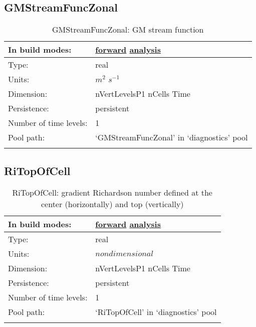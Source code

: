\subsection[GMStreamFuncZonal]{GMStreamFuncZonal}
\label{subsec:var_sec_diagnostics_GMStreamFuncZonal}
\begin{center}
\begin{longtable}{| p{2.0in} | p{4.0in} |}
        \hline 
        In build modes: & \hyperref[subsec:forward_var_tab_diagnostics]{forward} \hyperref[subsec:analysis_var_tab_diagnostics]{analysis} \\
        \hline 
        Type: & real \\
        \hline 
        Units: & $m^2$ $s^{-1}$ \\
        \hline 
        Dimension: & nVertLevelsP1 nCells Time \\
        \hline 
        Persistence: & persistent \\
        \hline 
        Number of time levels: & 1 \\
        \hline 
            Pool path: & `GMStreamFuncZonal' in `diagnostics' pool \\
		 \hline 
    \caption{GMStreamFuncZonal: GM stream function}
\end{longtable}
\end{center}
\subsection[RiTopOfCell]{RiTopOfCell}
\label{subsec:var_sec_diagnostics_RiTopOfCell}
\begin{center}
\begin{longtable}{| p{2.0in} | p{4.0in} |}
        \hline 
        In build modes: & \hyperref[subsec:forward_var_tab_diagnostics]{forward} \hyperref[subsec:analysis_var_tab_diagnostics]{analysis} \\
        \hline 
        Type: & real \\
        \hline 
        Units: & $nondimensional$ \\
        \hline 
        Dimension: & nVertLevelsP1 nCells Time \\
        \hline 
        Persistence: & persistent \\
        \hline 
        Number of time levels: & 1 \\
        \hline 
            Pool path: & `RiTopOfCell' in `diagnostics' pool \\
		 \hline 
    \caption{RiTopOfCell: gradient Richardson number defined at the center (horizontally) and top (vertically)}
\end{longtable}
\end{center}
